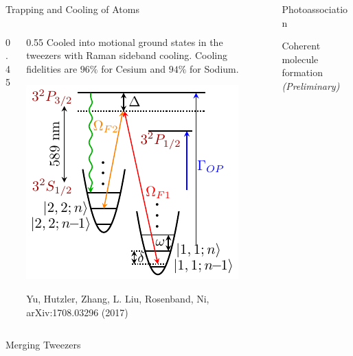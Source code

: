 \documentclass[final]{beamer}
\newlength{\sepwid}
\newlength{\coltwowid}
\newlength{\onecolwid}
\begin{document}
\begin{frame}[t]
\begin{columns}[t]
\begin{column}{\coltwowid}
\begin{block}{Trapping and Cooling of Atoms}
\begin{columns}[T]
\begin{column}{0.45\coltwowid}
\begin{center}
\begin{tikzpicture}
              \end{tikzpicture}
            \end{center}
          \end{column}
          \begin{column}{0.55\coltwowid}
            Cooled into motional ground states in the tweezers with Raman sideband cooling.
            Cooling fidelities are $96\%$ for Cesium and $94\%$ for Sodium.
            \vspace{2ex}
            \begin{center}
              \includegraphics[width=0.47\coltwowid]{na-rsc-schematics}
            \end{center}
            {\small Yu, Hutzler, Zhang, L. Liu, Rosenband, Ni, arXiv:1708.03296 (2017)}
          \end{column}
        \end{columns}
      \end{block}
      \begin{block}{Merging Tweezers}
      \end{block}
    \end{column} %

    \begin{column}{\sepwid}\end{column} %

    \begin{column}{\onecolwid} %
      \begin{block}{Photoassociation}
      \end{block}

      \begin{block}{Coherent molecule formation \textit{\small (Preliminary)}}
      \end{block}

    \end{column} %

  \end{columns} %

\end{frame} %
\end{document}
